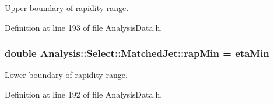 Upper boundary of rapidity range. 



Definition at line 193 of file Analysis\+Data.\+h.

\subsubsection[{\texorpdfstring{rap\+Min}{rapMin}}]{\setlength{\rightskip}{0pt plus 5cm}double Analysis\+::\+Select\+::\+Matched\+Jet\+::rap\+Min = {\bf eta\+Min}\hspace{0.3cm}{\ttfamily [static]}}\hypertarget{namespaceAnalysis_1_1Select_1_1MatchedJet_a4b14791609e4c5ca3c66c1811cbab05c}{}\label{namespaceAnalysis_1_1Select_1_1MatchedJet_a4b14791609e4c5ca3c66c1811cbab05c}


Lower boundary of rapidity range. 



Definition at line 192 of file Analysis\+Data.\+h.

